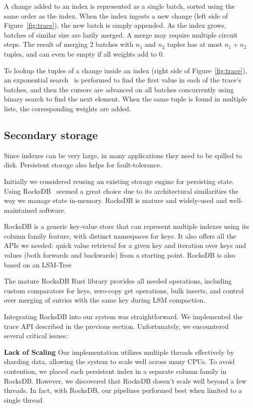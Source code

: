 A change added to an index is represented as a single batch, sorted
using the same order as the index.  When the index ingests a new
change (left side of Figure~\ref{fig:trace}), the new batch is simply
appended.  As the index grows, batches of similar size are lazily
merged.  A merge may require multiple circuit steps.  The result of
merging 2 batches with \(n_1\) and \(n_2\) tuples has at most \(n_1 +
n_2\) tuples, and can even be empty if all weights add to 0.

To lookup the tuples of a change inside an index (right side of
Figure~\ref{fig:trace}), an exponential search~\cite{bentley-ipl76} is
performed to find the first value in each of the trace's batches, and
then the cursors are advanced on all batches concurrently using binary
search to find the next element.  When the same tuple is found in
multiple lists, the corresponding weights are added.

\subsection{Secondary storage}

Since indexes can be very large, in many applications they need to be
spilled to disk.  Persistent storage also helps for fault-tolerance.

Initially we considered reusing an existing storage engine for
persisting state.  Using RocksDB~\cite{dong-ats21} seemed a great
choice due to its architectural similarities the way we manage state
in-memory.  RocksDB is mature and widely-used and well-maintained
software.

RocksDB is a generic key-value store that can represent multiple
indexes using its column family feature, with distinct namespaces for
keys. It also offers all the APIs we needed: quick value retrieval for
a given key and iteration over keys and values (both forwards and
backwards) from a starting point.  RocksDB is also based on an
LSM-Tree

The mature RocksDB Rust library provides all needed operations,
including custom comparators for keys, zero-copy get operations, bulk
inserts, and control over merging of entries with the same key during
LSM compaction.

Integrating RocksDB into our system was straightforward.  We
implemented the trace API described in the previous section.
Unfortunately, we encountered several critical issues:

\textbf{Lack of Scaling} Our implementation utilizes multiple threads
effectively by sharding data, allowing the system to scale well across
many CPUs.  To avoid contention, we placed each persistent index in a
separate column family in RocksDB. However, we discovered that RocksDB
doesn't scale well beyond a few threads. In fact, with RocksDB, our
pipelines performed best when limited to a single thread.

